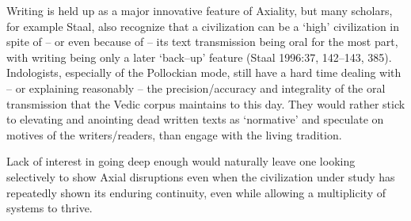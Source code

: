 Writing is held up as a major innovative feature of Axiality, but many scholars, for example Staal, also recognize that a civilization can be a ‘high’ civilization in spite of – or even because of – its text transmission being oral for the most part, with writing being only a later ‘back–up’ feature (Staal 1996:37, 142–143, 385). Indologists, especially of the Pollockian mode, still have a hard time dealing with – or explaining reasonably – the precision/accuracy and integrality of the oral transmission that the Vedic corpus maintains to this day. They would rather stick to elevating and anointing dead written texts as ‘normative’ and speculate on motives of the writers/readers, than engage with the living tradition.

Lack of interest in going deep enough would naturally leave one looking selectively to show Axial disruptions even when the civilization under study has repeatedly shown its enduring continuity, even while allowing a multiplicity of systems to thrive.

